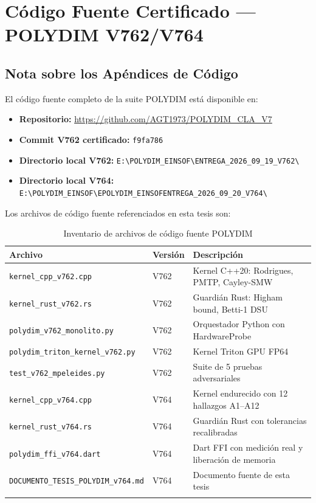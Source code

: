 \chapter{Código Fuente Certificado — POLYDIM V762/V764}
\label{ap:codigo}

\section*{Nota sobre los Apéndices de Código}

El código fuente completo de la suite POLYDIM está disponible en:
\begin{itemize}
\item \textbf{Repositorio:} \url{https://github.com/AGT1973/POLYDIM_CLA_V7}
\item \textbf{Commit V762 certificado:} \texttt{f9fa786}
\item \textbf{Directorio local V762:} \texttt{E:\textbackslash POLYDIM\_EINSOF\textbackslash ENTREGA\_2026\_09\_19\_V762\textbackslash}
\item \textbf{Directorio local V764:} \texttt{E:\textbackslash POLYDIM\_EINSOF\textbackslash EPOLYDIM\_EINSOFENTREGA\_2026\_09\_20\_V764\textbackslash}
\end{itemize}

Los archivos de código fuente referenciados en esta tesis son:
\begin{longtable}{lll}
\toprule
\textbf{Archivo} & \textbf{Versión} & \textbf{Descripción} \\
\midrule
\texttt{kernel\_cpp\_v762.cpp} & V762 & Kernel C++20: Rodrigues, PMTP, Cayley-SMW \\
\texttt{kernel\_rust\_v762.rs} & V762 & Guardián Rust: Higham bound, Betti-1 DSU \\
\texttt{polydim\_v762\_monolito.py} & V762 & Orquestador Python con HardwareProbe \\
\texttt{polydim\_triton\_kernel\_v762.py} & V762 & Kernel Triton GPU FP64 \\
\texttt{test\_v762\_mpeleides.py} & V762 & Suite de 5 pruebas adversariales \\
\texttt{kernel\_cpp\_v764.cpp} & V764 & Kernel endurecido con 12 hallazgos A1--A12 \\
\texttt{kernel\_rust\_v764.rs} & V764 & Guardián Rust con tolerancias recalibradas \\
\texttt{polydim\_ffi\_v764.dart} & V764 & Dart FFI con medición real y liberación de memoria \\
\texttt{DOCUMENTO\_TESIS\_POLYDIM\_v764.md} & V764 & Documento fuente de esta tesis \\
\bottomrule
\caption{Inventario de archivos de código fuente POLYDIM}
\label{tab:codigo_fuente}
\end{longtable}

